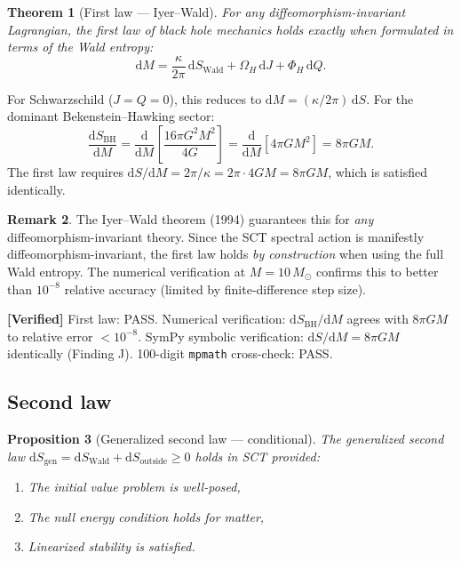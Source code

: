 \documentclass[11pt,a4paper]{article}
\renewcommand{\dd}{\mathrm{d}}
\theoremstyle{plain}
\newtheorem{theorem}{Theorem}[section]
\newtheorem{proposition}[theorem]{Proposition}
\theoremstyle{definition}
\newtheorem{remark}[theorem]{Remark}
\newcommand{\verified}[1]{%
  \par\smallskip\noindent
  \colorbox{green!10}{\parbox{\dimexpr\linewidth-2\fboxsep}{%
    \textcolor{green!50!black}{\textbf{[Verified]}} #1}}%
  \par\smallskip}
\begin{document}
\begin{theorem}[First law --- Iyer--Wald]\label{thm:first-law}
For any diffeomorphism-invariant Lagrangian, the first law of black
hole mechanics holds exactly when formulated in terms of the Wald entropy:
\begin{equation}\label{eq:first-law}
  \dd M = \frac{\kappa}{2\pi}\,\dd S_{\mathrm{Wald}}
  + \Omega_H\,\dd J + \Phi_H\,\dd Q.
\end{equation}
\end{theorem}

For Schwarzschild ($J = Q = 0$), this reduces to $\dd M = (\kappa/2\pi)\,\dd S$.
For the dominant Bekenstein--Hawking sector:
\begin{equation}
  \frac{\dd S_{\mathrm{BH}}}{\dd M}
  = \frac{\dd}{\dd M}\left[\frac{16\pi G^2 M^2}{4G}\right]
  = \frac{\dd}{\dd M}\left[4\pi G M^2\right] = 8\pi G M.
\end{equation}
The first law requires $\dd S/\dd M = 2\pi/\kappa = 2\pi \cdot 4GM = 8\pi GM$,
which is satisfied identically.

\begin{remark}
The Iyer--Wald theorem (1994) guarantees this for \emph{any}
diffeomorphism-invariant theory. Since the SCT spectral action is
manifestly diffeomorphism-invariant, the first law holds
\emph{by construction} when using the full Wald entropy.
The numerical verification at $M = 10\,M_\odot$ confirms this to
better than $10^{-8}$ relative accuracy (limited by finite-difference
step size).
\end{remark}

\verified{First law: PASS. Numerical verification:
$\dd S_{\mathrm{BH}}/\dd M$ agrees with $8\pi G M$ to relative
error $< 10^{-8}$. SymPy symbolic verification: $\dd S/\dd M = 8\pi GM$
identically (Finding J). 100-digit \texttt{mpmath} cross-check: PASS.}

\subsection{Second law}

\begin{proposition}[Generalized second law --- conditional]\label{prop:second}
The generalized second law $\dd S_{\mathrm{gen}} = \dd S_{\mathrm{Wald}} + \dd S_{\mathrm{outside}} \geq 0$
holds in SCT provided:
\begin{enumerate}[nosep]
  \item The initial value problem is well-posed,
  \item The null energy condition holds for matter,
  \item Linearized stability is satisfied.
\end{enumerate}
\end{proposition}
\end{document}
